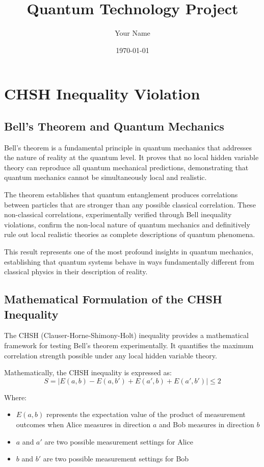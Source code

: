 \documentclass[12pt,a4paper]{article}
\title{Quantum Technology Project}
\author{Your Name}
\date{\today}
\begin{document}
\maketitle

\section{CHSH Inequality Violation}


\subsection{Bell's Theorem and Quantum Mechanics}
Bell's theorem is a fundamental principle in quantum mechanics that addresses the nature of reality at the quantum level. It proves that no local hidden variable theory can reproduce all quantum mechanical predictions, demonstrating that quantum mechanics cannot be simultaneously local and realistic.

The theorem establishes that quantum entanglement produces correlations between particles that are stronger than any possible classical correlation. These non-classical correlations, experimentally verified through Bell inequality violations, confirm the non-local nature of quantum mechanics and definitively rule out local realistic theories as complete descriptions of quantum phenomena.

This result represents one of the most profound insights in quantum mechanics, establishing that quantum systems behave in ways fundamentally different from classical physics in their description of reality.

\subsection{Mathematical Formulation of the CHSH Inequality}

The CHSH (Clauser-Horne-Shimony-Holt) inequality provides a mathematical framework for testing Bell's theorem experimentally. It quantifies the maximum correlation strength possible under any local hidden variable theory.

Mathematically, the CHSH inequality is expressed as:
\begin{equation}
S = |E(a,b) - E(a,b') + E(a',b) + E(a',b')| \leq 2
\end{equation}

Where:
\begin{itemize}
    \item $E(a,b)$ represents the expectation value of the product of measurement outcomes when Alice measures in direction $a$ and Bob measures in direction $b$
    \item $a$ and $a'$ are two possible measurement settings for Alice
    \item $b$ and $b'$ are two possible measurement settings for Bob
\end{itemize}
\end{document}
